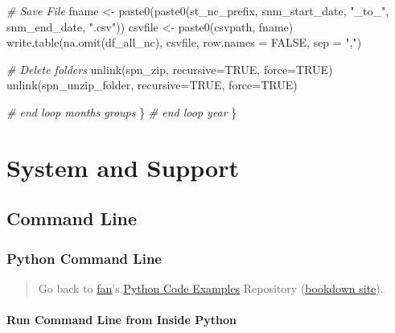\documentclass[
]{book}
\newenvironment{Shaded}{\begin{snugshade}}{\end{snugshade}}
\newcommand{\AttributeTok}[1]{\textcolor[rgb]{0.77,0.63,0.00}{#1}}
\newcommand{\CommentTok}[1]{\textcolor[rgb]{0.56,0.35,0.01}{\textit{#1}}}
\newcommand{\ConstantTok}[1]{\textcolor[rgb]{0.00,0.00,0.00}{#1}}
\newcommand{\FunctionTok}[1]{\textcolor[rgb]{0.00,0.00,0.00}{#1}}
\newcommand{\NormalTok}[1]{#1}
\newcommand{\OtherTok}[1]{\textcolor[rgb]{0.56,0.35,0.01}{#1}}
\newcommand{\StringTok}[1]{\textcolor[rgb]{0.31,0.60,0.02}{#1}}
\begin{document}
\begin{Shaded}
\begin{Highlighting}[]
    \CommentTok{\# Save File}
\NormalTok{    fname }\OtherTok{\textless{}{-}} \FunctionTok{paste0}\NormalTok{(}\FunctionTok{paste0}\NormalTok{(st\_nc\_prefix,}
\NormalTok{                           snm\_start\_date, }\StringTok{"\_to\_"}\NormalTok{, snm\_end\_date,}
                           \StringTok{".csv"}\NormalTok{))}
\NormalTok{    csvfile }\OtherTok{\textless{}{-}} \FunctionTok{paste0}\NormalTok{(csvpath, fname)}
    \FunctionTok{write.table}\NormalTok{(}\FunctionTok{na.omit}\NormalTok{(df\_all\_nc), csvfile, }\AttributeTok{row.names =} \ConstantTok{FALSE}\NormalTok{, }\AttributeTok{sep =} \StringTok{","}\NormalTok{)}

    \CommentTok{\# Delete folders}
    \FunctionTok{unlink}\NormalTok{(spn\_zip, }\AttributeTok{recursive=}\ConstantTok{TRUE}\NormalTok{, }\AttributeTok{force=}\ConstantTok{TRUE}\NormalTok{)}
    \FunctionTok{unlink}\NormalTok{(spn\_unzip\_folder, }\AttributeTok{recursive=}\ConstantTok{TRUE}\NormalTok{, }\AttributeTok{force=}\ConstantTok{TRUE}\NormalTok{)}

  \CommentTok{\# end loop months groups}
\NormalTok{  \}}
\CommentTok{\# end loop year}
\NormalTok{\}}
\end{Highlighting}
\end{Shaded}

\hypertarget{system-and-support}{%
\chapter{System and Support}\label{system-and-support}}

\hypertarget{command-line}{%
\section{Command Line}\label{command-line}}

\hypertarget{python-command-line}{%
\subsection{Python Command Line}\label{python-command-line}}

\begin{quote}
Go back to \href{http://fanwangecon.github.io/}{fan}'s \href{https://fanwangecon.github.io/pyfan/}{Python Code Examples} Repository (\href{https://fanwangecon.github.io/pyfan/bookdown}{bookdown site}).
\end{quote}

\hypertarget{run-command-line-from-inside-python}{%
\subsubsection{Run Command Line from Inside Python}\label{run-command-line-from-inside-python}}
\end{document}
